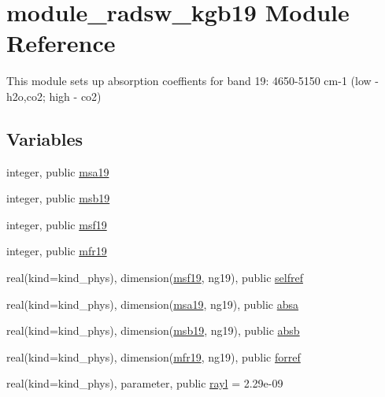 \hypertarget{namespacemodule__radsw__kgb19}{}\section{module\+\_\+radsw\+\_\+kgb19 Module Reference}
\label{namespacemodule__radsw__kgb19}


This module sets up absorption coeffients for band 19\+: 4650-\/5150 cm-\/1 (low -\/ h2o,co2; high -\/ co2)  


\subsection*{Variables}
\begin{DoxyCompactItemize}
\item 
integer, public \hyperlink{namespacemodule__radsw__kgb19_a498993cce64baa8f22c8dfdce632cf85}{msa19}
\item 
integer, public \hyperlink{namespacemodule__radsw__kgb19_a42771fcf9dd17b5c9d0d03cb2bf1c923}{msb19}
\item 
integer, public \hyperlink{namespacemodule__radsw__kgb19_a86778b12ff439f4f83fda891e7ae2bfe}{msf19}
\item 
integer, public \hyperlink{namespacemodule__radsw__kgb19_a57f837ef4316dc2441bca3fde3998156}{mfr19}
\item 
real(kind=kind\+\_\+phys), dimension(\hyperlink{namespacemodule__radsw__kgb19_a86778b12ff439f4f83fda891e7ae2bfe}{msf19}, ng19), public \hyperlink{namespacemodule__radsw__kgb19_adb26cae00c05ac5c048a4db5a319a2eb}{selfref}
\item 
real(kind=kind\+\_\+phys), dimension(\hyperlink{namespacemodule__radsw__kgb19_a498993cce64baa8f22c8dfdce632cf85}{msa19}, ng19), public \hyperlink{namespacemodule__radsw__kgb19_ad9a6fc80122a2f06d9f2277d74e00c85}{absa}
\item 
real(kind=kind\+\_\+phys), dimension(\hyperlink{namespacemodule__radsw__kgb19_a42771fcf9dd17b5c9d0d03cb2bf1c923}{msb19}, ng19), public \hyperlink{namespacemodule__radsw__kgb19_ad1171c012a1615c4b98eb3e95276867d}{absb}
\item 
real(kind=kind\+\_\+phys), dimension(\hyperlink{namespacemodule__radsw__kgb19_a57f837ef4316dc2441bca3fde3998156}{mfr19}, ng19), public \hyperlink{namespacemodule__radsw__kgb19_abb4c30ad8e82694b33df78bb2687df6d}{forref}
\item 
real(kind=kind\+\_\+phys), parameter, public \hyperlink{namespacemodule__radsw__kgb19_ac79ad61e8d246d6075664df4201373d7}{rayl} = 2.\+29e-\/09
\end{DoxyCompactItemize}


